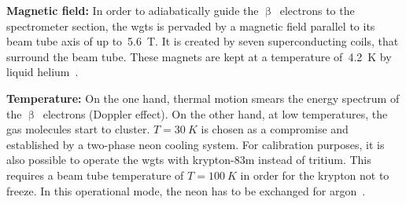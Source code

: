 {\par\textbf{Magnetic field:}
In order to adiabatically guide the $\upbeta$~electrons to the spectrometer section, the \gls{wgts} is pervaded by a magnetic field parallel to its beam tube axis of up to~\SI{5.6}{T}. It is created by seven superconducting coils, that surround the beam tube. These magnets are kept at a temperature of~\SI{4.2}{K} by liquid helium~\cite{Arenz2018}.}

{\par\textbf{Temperature:}
On the one hand, thermal motion smears the energy spectrum of the $\upbeta$~electrons (Doppler effect). On the other hand, at low temperatures, the gas molecules start to cluster. $T=\SI{30}{K}$ is chosen as a compromise and established by a two-phase neon cooling system. For calibration purposes, it is also possible to operate the \gls{wgts} with krypton-83m instead of tritium. This requires a beam tube temperature of $T=\SI{100}{K}$ in order for the krypton not to freeze. In this operational mode, the neon has to be exchanged for argon~\cite{Angrik:2005ep}.}
